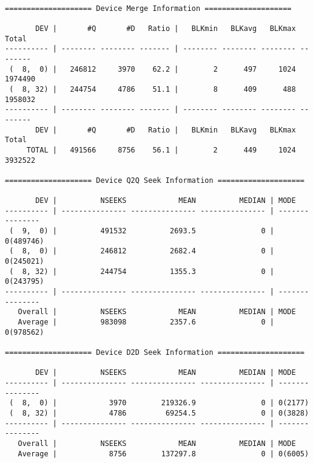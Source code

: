 \begin{verbatim}

==================== Device Merge Information ====================

       DEV |       #Q       #D   Ratio |   BLKmin   BLKavg   BLKmax    Total
---------- | -------- -------- ------- | -------- -------- -------- --------
 (  8,  0) |   246812     3970    62.2 |        2      497     1024  1974490
 (  8, 32) |   244754     4786    51.1 |        8      409      488  1958032
---------- | -------- -------- ------- | -------- -------- -------- --------
       DEV |       #Q       #D   Ratio |   BLKmin   BLKavg   BLKmax    Total
     TOTAL |   491566     8756    56.1 |        2      449     1024  3932522

==================== Device Q2Q Seek Information ====================

       DEV |          NSEEKS            MEAN          MEDIAN | MODE
---------- | --------------- --------------- --------------- | ---------------
 (  9,  0) |          491532          2693.5               0 | 0(489746)
 (  8,  0) |          246812          2682.4               0 | 0(245021)
 (  8, 32) |          244754          1355.3               0 | 0(243795)
---------- | --------------- --------------- --------------- | ---------------
   Overall |          NSEEKS            MEAN          MEDIAN | MODE
   Average |          983098          2357.6               0 | 0(978562)

==================== Device D2D Seek Information ====================

       DEV |          NSEEKS            MEAN          MEDIAN | MODE
---------- | --------------- --------------- --------------- | ---------------
 (  8,  0) |            3970        219326.9               0 | 0(2177)
 (  8, 32) |            4786         69254.5               0 | 0(3828)
---------- | --------------- --------------- --------------- | ---------------
   Overall |          NSEEKS            MEAN          MEDIAN | MODE
   Average |            8756        137297.8               0 | 0(6005)

\end{verbatim}
\newpage
